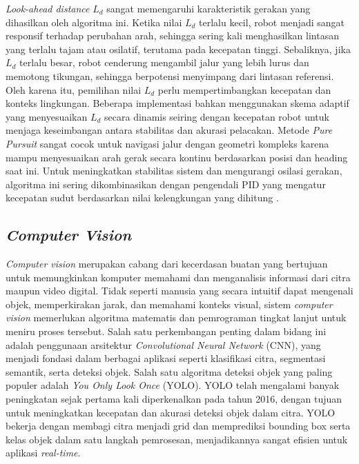 \emph{Look-ahead distance} \(L_d\) sangat memengaruhi karakteristik gerakan yang dihasilkan oleh algoritma ini. Ketika nilai \(L_d\) terlalu kecil, robot menjadi sangat responsif terhadap perubahan arah, sehingga sering kali menghasilkan lintasan yang terlalu tajam atau osilatif, terutama pada kecepatan tinggi. Sebaliknya, jika \(L_d\) terlalu besar, robot cenderung mengambil jalur yang lebih lurus dan memotong tikungan, sehingga berpotensi menyimpang dari lintasan referensi. Oleh karena itu, pemilihan nilai \(L_d\) perlu mempertimbangkan kecepatan dan konteks lingkungan.   Beberapa implementasi bahkan menggunakan skema adaptif yang menyesuaikan \(L_d\) secara dinamis seiring dengan kecepatan robot untuk menjaga keseimbangan antara stabilitas dan akurasi pelacakan. Metode \emph{Pure Pursuit} sangat cocok untuk navigasi jalur dengan geometri kompleks karena mampu menyesuaikan arah gerak secara kontinu berdasarkan posisi dan heading saat ini. Untuk meningkatkan stabilitas sistem dan mengurangi osilasi gerakan, algoritma ini sering dikombinasikan dengan pengendali PID yang mengatur kecepatan sudut berdasarkan nilai kelengkungan yang dihitung \cite{coulter1992implementation}.



\subsection{\emph{Computer Vision}}

\emph{Computer vision} merupakan cabang dari kecerdasan buatan yang bertujuan untuk memungkinkan komputer memahami dan menganalisis informasi dari citra maupun video digital. Tidak seperti manusia yang secara intuitif dapat mengenali objek, memperkirakan jarak, dan memahami konteks visual, sistem \emph{computer vision} memerlukan algoritma matematis dan pemrograman tingkat lanjut untuk meniru proses tersebut. Salah satu perkembangan penting dalam bidang ini adalah penggunaan arsitektur \emph{Convolutional Neural Network} (CNN), yang menjadi fondasi dalam berbagai aplikasi seperti klasifikasi citra, segmentasi semantik, serta deteksi objek. Salah satu algoritma deteksi objek yang paling populer adalah \emph{You Only Look Once} (YOLO). YOLO telah mengalami banyak peningkatan sejak pertama kali diperkenalkan pada tahun 2016, dengan tujuan untuk meningkatkan kecepatan dan akurasi deteksi objek dalam citra. YOLO bekerja dengan membagi citra menjadi grid dan memprediksi bounding box serta kelas objek dalam satu langkah pemrosesan, menjadikannya sangat efisien untuk aplikasi \emph{real-time}.


